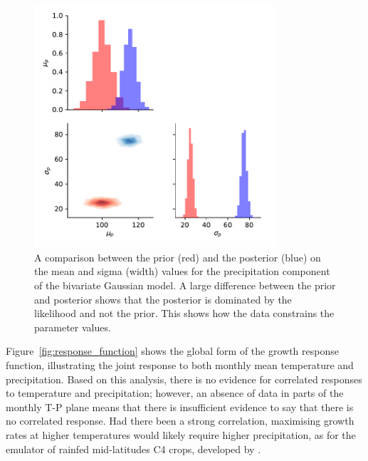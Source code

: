 \documentclass[12pt]{iopart}
\begin{document}
\begin{figure}
\centering
\includegraphics[width=0.8\textwidth]{./figures/2d_Gauss_prior_vs_post_precip_mean_vs_sigma}
\caption{\label{fig:2d_Gauss_prior_vs_post_precip_mean_vs_sigma} A comparison between the prior (red) and the posterior (blue) on the mean and sigma (width) values for the precipitation component of the bivariate Gaussian model. A large difference between the prior and posterior shows that the posterior is dominated by the likelihood and not the prior. This shows how the data constrains the parameter values.}
\end{figure}

Figure~\ref{fig:response_function} shows the global form of the growth response function, illustrating the joint response to both monthly mean temperature and precipitation. Based on this analysis, there is no evidence for correlated responses to temperature and precipitation; however, an absence of data in parts of the monthly T-P plane means that there is insufficient evidence to say that there is no correlated response. Had there been a strong correlation, maximising growth rates at higher temperatures would likely require higher precipitation, as for the emulator of rainfed mid-latitudes C4 crops, developed by \cite{snyder:2018}.



\end{document}
